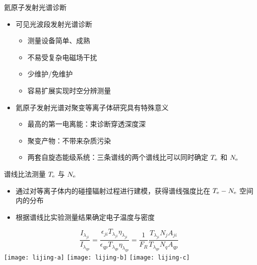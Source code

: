 \begin{CJK*}{UTF8}{kai}
\begin{frame}{氦原子发射光谱诊断}
	\begin{itemize}
		\item 可见光波段发射光谱诊断
			\begin{itemize}
				\item 测量设备简单、成熟
				\item 不易受复杂电磁场干扰
				\item 少维护/免维护
				\item 容易扩展实现时空分辨测量
			\end{itemize}
		\bigskip
		\item 氦原子发射光谱对聚变等离子体研究具有特殊意义
			\begin{itemize}
				\item 最高的第一电离能：束诊断穿透深度深
				\item 聚变产物：不带来杂质污染
				\item 两套自旋态能级系统：三条谱线的两个谱线比可以同时确定 $T_{\rm e}$ 和 $N_{\rm e}$
			\end{itemize}
	\end{itemize}
\end{frame}

\begin{frame}{谱线比法测量 $T_{\rm e}$ 与 $N_{\rm e}$}
	\begin{itemize}
  		\item 通过对等离子体内的碰撞辐射过程进行建模，获得谱线强度比在 $T_{\rm e}-N_{\rm e}$ 空间内的分布
  		\item 根据谱线比实验测量结果确定电子温度与密度
	\end{itemize}
\vspace*{-2em}
	\begin{center}
		$$
		\frac{I_{\lambda_{ji}}}{I_{\lambda_{qp}}}=	\frac{\epsilon_{ji}T_{\lambda_{ji}}\eta_{\lambda_{ji}}}{\epsilon_{qp}T_{\lambda_{qp}}\eta_{\lambda_{qp}}}
		=\frac{1}{F_R}\frac{T_{\lambda_{ji}}N_jA_{ji}}{T_{\lambda_{qp}}N_qA_{qp}}
		$$
	\texttt{[image: lijing-a]}
	\texttt{[image: lijing-b]}
	\texttt{[image: lijing-c]}
	\\
	\hfill{}
	\end{center}
\end{frame}


\end{CJK*}
